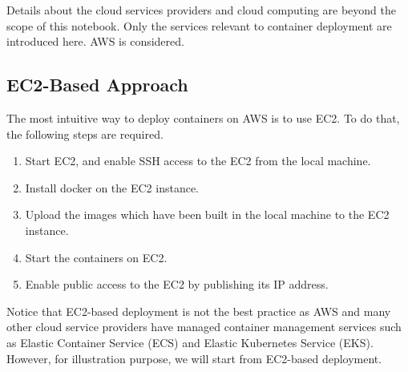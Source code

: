 Details about the cloud services providers and cloud computing are beyond the scope of this notebook. Only the services relevant to container deployment are introduced here. AWS is considered.

\subsection{EC2-Based Approach}

The most intuitive way to deploy containers on AWS is to use EC2. To do that, the following steps are required.

\begin{enumerate}
	\item Start EC2, and enable SSH access to the EC2 from the local machine.
	\item Install docker on the EC2 instance.
	\item Upload the images which have been built in the local machine to the EC2 instance.
	\item Start the containers on EC2.
	\item Enable public access to the EC2 by publishing its IP address.
\end{enumerate}

Notice that EC2-based deployment is not the best practice as AWS and many other cloud service providers have managed container management services such as Elastic Container Service (ECS) and Elastic Kubernetes Service (EKS). However, for illustration purpose, we will start from EC2-based deployment.

